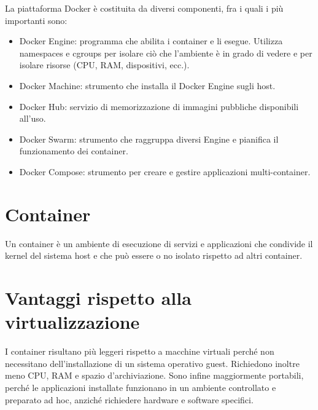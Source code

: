 La piattaforma Docker è costituita da diversi componenti, fra i quali i più importanti sono:
\begin{itemize}
    \item Docker Engine: programma che abilita i container e li esegue. Utilizza namespaces e cgroups per isolare ciò che l'ambiente è in grado di vedere e per isolare risorse (CPU, RAM, dispositivi, ecc.).
    \item Docker Machine: strumento che installa il Docker Engine sugli host.
    \item Docker Hub: servizio di memorizzazione di immagini pubbliche disponibili all'uso.
    \item Docker Swarm: strumento che raggruppa diversi Engine e pianifica il funzionamento dei container.
    \item Docker Compose: strumento per creare e gestire applicazioni multi-container.
\end{itemize}


\section{Container}
Un container è un ambiente di esecuzione di servizi e applicazioni che condivide il kernel del sistema host e che può essere o no isolato rispetto ad altri container.
 
\section{Vantaggi rispetto alla virtualizzazione}
I container risultano più leggeri rispetto a macchine virtuali perché non necessitano dell'installazione di un sistema operativo guest. Richiedono inoltre meno CPU, RAM e spazio d'archiviazione. Sono infine maggiormente portabili, perché le applicazioni installate funzionano in un ambiente controllato e preparato ad hoc, anziché richiedere hardware e software specifici.